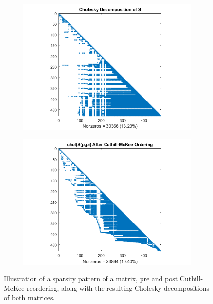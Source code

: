 \begin{figure}
\begin{subfigure}{0.49\textwidth}
        \includegraphics[width=\textwidth]{Figures/chol_unordered}
    \end{subfigure}\hfill
     \begin{subfigure}{0.49\textwidth}
        \includegraphics[width=\textwidth]{Figures/chol_cmckee}
    \end{subfigure}
    \caption{Illustration of a sparsity pattern of a matrix, pre and post Cuthill-McKee reordering, along with the resulting Cholesky decompositions of both matrices.\cite{matlab}}
    \label{fig:ordering}
\end{figure}